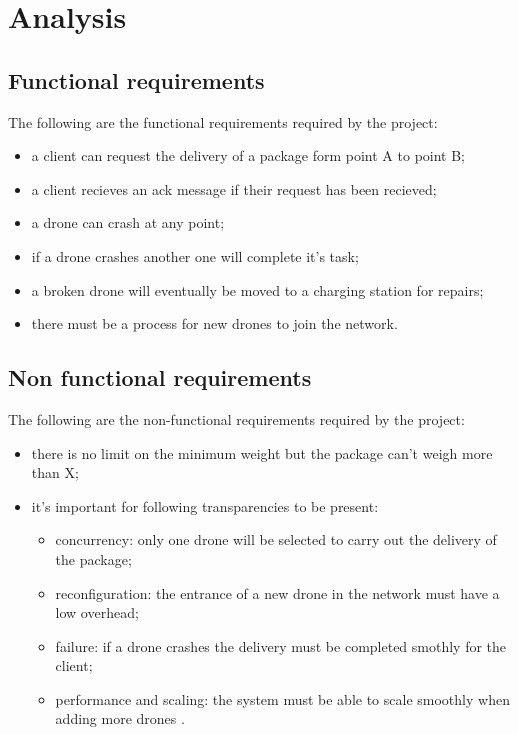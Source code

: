 \documentclass[a4paper, oneside]{memoir}
\begin{document}
\chapter{Analysis}\label{ch:analysis}


\section{Functional requirements}
The following are the functional requirements required by the project:
\begin{itemize}
\item a client can request the delivery of a package form point A to point B;
\item a client recieves an ack message if their request has been recieved;
\item a drone can crash at any point;
\item if a drone crashes another one will complete it's task;
\item a broken drone will eventually be moved to a charging station for repairs;
\item there must be a process for new drones to join the network.
\end{itemize}

\section{Non functional requirements}
The following are the non-functional requirements required by the project:
\begin{itemize}
\item there is no limit on the minimum weight but the package can't weigh more than X;
\item it's important for following transparencies to be present:
	\begin{itemize}
	\item concurrency: only one drone will be selected to carry out the delivery of the package;
	\item reconfiguration: the entrance of a new drone in the network must have a low overhead;
	\item failure: if a drone crashes the delivery must be completed smothly for the client;
	\item performance and scaling: the system must be able to scale smoothly when adding more drones .
	\end{itemize}
\end{itemize}
\end{document}
